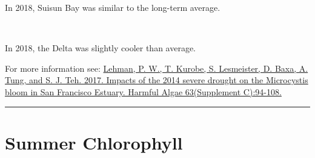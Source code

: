 \documentclass[
]{book}
\begin{document}
\begin{panel-grid}
\begin{columns-nocenter}
\begin{column40}
\end{column40}

\begin{column800}

In 2018, Suisun Bay was similar to the long-term average.

\end{column800}

\begin{column40}

~

\end{column40}

\begin{column800}

In 2018, the Delta was slightly cooler than average.

\end{column800}

\end{columns-nocenter}

\end{panel-grid}

\begin{disclaimer}
For more information see:
\href{https://www.sciencedirect.com/science/article/pii/S1568988316302177}{Lehman,
P. W., T. Kurobe, S. Lesmeister, D. Baxa, A. Tung, and S. J. Teh. 2017.
Impacts of the 2014 severe drought on the Microcystis bloom in San
Francisco Estuary. Harmful Algae 63(Supplement C):94-108.}
\end{disclaimer}

\begin{center}\rule{0.5\linewidth}{0.5pt}\end{center}

\hypertarget{summer-chlorophyll}{%
\section{Summer Chlorophyll}\label{summer-chlorophyll}}
\end{document}
